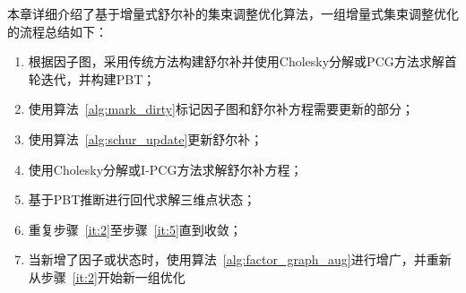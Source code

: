 本章详细介绍了基于增量式舒尔补的集束调整优化算法，一组增量式集束调整优化的流程总结如下：
\begin{enumerate}
    \item 根据因子图，采用传统方法构建舒尔补并使用Cholesky分解或PCG方法求解首轮迭代，并构建PBT；
    \item\label{it:2} 使用算法~\ref{alg:mark_dirty}标记因子图和舒尔补方程需要更新的部分；
    \item\label{it:3} 使用算法~\ref{alg:schur_update}更新舒尔补；
    \item\label{it:4} 使用Cholesky分解或I-PCG方法求解舒尔补方程；
    \item\label{it:5} 基于PBT推断进行回代求解三维点状态；
    \item 重复步骤~\ref{it:2}至步骤~\ref{it:5}直到收敛；
    \item 当新增了因子或状态时，使用算法~\ref{alg:factor_graph_aug}进行增广，并重新从步骤~\ref{it:2}开始新一组优化
\end{enumerate}
